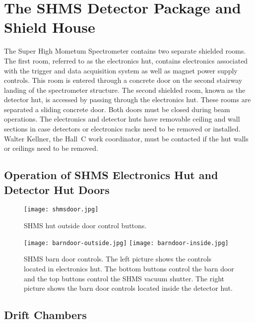 
\section{The SHMS Detector Package and Shield House }

The Super High Mometum Spectrometer contains two separate shielded
rooms.  The first room, referred to as the electronics hut, contains
electronics associated with the trigger and data acquisition system as
well as magnet power supply controls.    This room is entered through a concrete
door on the second stairway landing of the spectrometer structure.
The second shielded room, known as the detector hut, is accessed by
passing through the electronics hut.  These rooms are separated a
sliding concrete door.  Both doors must be closed during beam
operations.  The electronics and detector huts have removable ceiling
and wall sections in case detectors or electronics racks need to be
removed or installed.  Walter Kellner, the Hall~C work coordinator,  
must be contacted if the hut walls or ceilings need to be removed.

\subsection{Operation of SHMS Electronics Hut and Detector Hut Doors}

\begin{figure}
\begin{center}
\texttt{[image: shmsdoor.jpg]}
\caption{\label{fig:shmsdoorcontrol}SHMS hut outside door control buttons.}
\end{center}
\end{figure}

\begin{figure}
\begin{center}
\texttt{[image: barndoor-outside.jpg]}
\texttt{[image: barndoor-inside.jpg]}
\caption{\label{fig:barndoorcontrol}SHMS barn door controls.  The left
  picture shows the controls located in electronics hut.  The bottom
  buttons control the barn door and the top buttons control the SHMS
  vacuum shutter.  The right picture shows the barn door controls
  located inside the detector hut.}
\end{center}
\end{figure}

\subsection{Drift Chambers}

